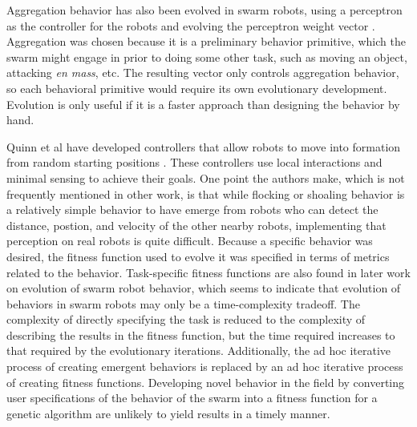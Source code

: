 \documentclass[]{article}
\begin{document}
Aggregation behavior has also been evolved in swarm robots, using a perceptron as the controller for the robots and evolving the perceptron weight vector \cite{bahgecci2005evolving}. 
Aggregation was chosen because it is a preliminary behavior primitive, which the swarm might engage in prior to doing some other task, such as moving an object, attacking \emph{en mass}, etc.
The resulting vector only controls aggregation behavior, so each behavioral primitive would require its own evolutionary development. 
Evolution is only useful if it is a faster approach than designing the behavior by hand. 

Quinn et al have developed controllers that allow robots to move into formation from random starting positions \cite{quinn2003evolving}. 
These controllers use local interactions and minimal sensing to achieve their goals. 
One point the authors make, which is not frequently mentioned in other work, is that while flocking or shoaling behavior is a relatively simple behavior to have emerge from robots who can detect the distance, postion, and velocity of the other nearby robots, implementing that perception on real robots is quite difficult.
Because a specific behavior was desired, the fitness function used to evolve it was specified in terms of metrics related to the behavior. 
Task-specific fitness functions are also found in later work on evolution of swarm robot behavior, which seems to indicate that evolution of behaviors in swarm robots may only be a time-complexity tradeoff. 
The complexity of directly specifying the task is reduced to the complexity of describing the results in the fitness function, but the time required increases to that required by the evolutionary iterations. 
Additionally, the ad hoc iterative process of creating emergent behaviors is replaced by an ad hoc iterative process of creating fitness functions.
Developing novel behavior in the field by converting user specifications of the behavior of the swarm into a fitness function for a genetic algorithm are unlikely to yield results in a timely manner. 
\end{document}
